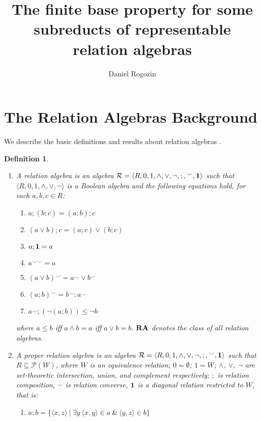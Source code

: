 \documentclass[a4paper]{article}
\author{Daniel Rogozin}
\date{}
\title{The finite base property for some subreducts of representable relation algebras}
\theoremstyle{defin}
\newtheorem{defin}{Definition}
\theoremstyle{theorem}
\theoremstyle{prop}
\theoremstyle{lemma}
\theoremstyle{ex}
\theoremstyle{col}
\begin{document}
\maketitle

\nocite{*}

\section{The Relation Algebras Background}

We describe the basic definitions and results about relation algebras \cite{hirsch2002relation} \cite{maddux2006relation}.

\begin{defin}
  $ $

  \begin{enumerate}
    \item A relation algebra is an algebra $\mathcal{R} = \langle R, 0, 1, \wedge, \vee, \neg, ;, {}^{\smile}, {\bf 1 }\rangle$ such that $\langle R, 0, 1, \wedge, \vee, \neg \rangle$ is a Boolean algebra and the following
    equations hold, for each $a, b, c \in R$:
    \begin{enumerate}
      \item $a ; (b ; c) = (a ; b) ; c$
      \item $(a \vee b) ; c = (a ; c) \vee (b ; c)$
      \item $a ; {\bf 1} = a$
      \item $a^{\smile \smile} = a$
      \item $(a \vee b)^{\smile} = a^{\smile} \vee b^{\smile}$
      \item $(a ; b)^{\smile} = b^{\smile} ; a^{\smile}$
      \item $a^{\smile} ; (\neg (a ; b)) \leq \neg b$
    \end{enumerate}
    where $a \leq b$ iff $a \wedge b = a$ iff $a \vee b = b$. ${\bf RA}$ denotes the class of all relation
    algebras.
    \item A proper relation algebra is an algebra $\mathcal{R} = \langle R, 0, 1, \wedge, \vee, \neg, ;, {}^{\smile}, {\bf 1 }\rangle$ such that $R \subseteq \mathcal{P}(W)$, where $W$ is an equivalence relation; $0 = \emptyset$; $1 = W$; $\wedge$, $\vee$, $\neg$ are set-theoretic intersection, union, and
    complement respectively; $;$ is relation composition, ${}^{\smile}$ is relation converse, ${\bf 1}$ is a
    diagonal relation restricted to $W$, that is:
    \begin{enumerate}
    \item $a ; b = \{ \langle x, z \rangle \: | \: \exists y \: \langle x, y \rangle \in a \: \& \: \langle y, z \rangle \in b \}$

\end{enumerate}
\end{enumerate}
\end{defin}
\end{document}
